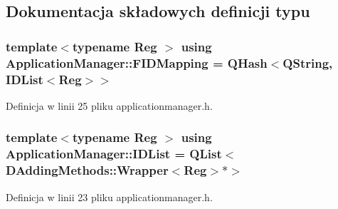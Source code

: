 \subsection{Dokumentacja składowych definicji typu}
\hypertarget{class_application_manager_a00564f65d5da07b75a4dc0d0d13c2dc1}{
\subsubsection[{F\-I\-D\-Mapping}]{\setlength{\rightskip}{0pt plus 5cm}template$<$typename Reg $>$ using {\bf Application\-Manager\-::\-F\-I\-D\-Mapping} =  Q\-Hash$<$Q\-String, {\bf I\-D\-List}$<$Reg$>$$>$}}\label{class_application_manager_a00564f65d5da07b75a4dc0d0d13c2dc1}


Definicja w linii 25 pliku applicationmanager.\-h.

\hypertarget{class_application_manager_afc6759e44d61ba108cadcea101b30bc7}{
\subsubsection[{I\-D\-List}]{\setlength{\rightskip}{0pt plus 5cm}template$<$typename Reg $>$ using {\bf Application\-Manager\-::\-I\-D\-List} =  Q\-List$<${\bf D\-Adding\-Methods\-::\-Wrapper}$<$Reg$>$$\ast$$>$}}\label{class_application_manager_afc6759e44d61ba108cadcea101b30bc7}


Definicja w linii 23 pliku applicationmanager.\-h.



